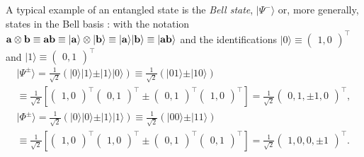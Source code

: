 {\color{blue}
\bexample
\label{bellstate1}
A typical example of an entangled state is the
{\em Bell state},   $\vert \Psi^- \rangle$
or, more generally, states in the Bell basis  :
with the notation $
{\bf a}
\otimes
{\bf b}
\equiv
{\bf a}
{\bf b}
\equiv
\vert {\bf a}\rangle
\otimes
\vert {\bf b}\rangle
\equiv
\vert {\bf a}\rangle
\vert {\bf b}\rangle
\equiv
\vert {\bf a} {\bf b}\rangle
$
and the identifications
$\vert 0 \rangle \equiv  \begin{pmatrix}1,0\end{pmatrix}^\intercal$ and
$\vert 1 \rangle \equiv  \begin{pmatrix}0,1\end{pmatrix}^\intercal$
\begin{equation}
\begin{split}
\vert \Psi^\pm \rangle
 = \frac{1}{\sqrt{2}}\left(\vert 0 \rangle \vert 1 \rangle \pm \vert 1 \rangle \vert 0 \rangle  \right)
\equiv \frac{1}{\sqrt{2}}\left(\vert 0   1 \rangle \pm \vert 1   0 \rangle  \right)
\qquad \qquad
\\
\equiv
\frac{1}{\sqrt{2}}
\left[
\begin{pmatrix}1,0\end{pmatrix}^\intercal
\begin{pmatrix}0,1\end{pmatrix}^\intercal
\pm
\begin{pmatrix}0,1\end{pmatrix}^\intercal
\begin{pmatrix}1,0\end{pmatrix}^\intercal
\right]
=
\frac{1}{\sqrt{2}}
\begin{pmatrix}0,1,\pm 1,0\end{pmatrix}^\intercal
,\\
\vert \Phi^\pm \rangle
 = \frac{1}{\sqrt{2}}\left(\vert 0 \rangle \vert 0 \rangle \pm \vert 1 \rangle \vert 1 \rangle  \right)
 \equiv \frac{1}{\sqrt{2}}\left(\vert 0   0 \rangle \pm \vert 1   1 \rangle  \right)
\qquad \qquad
\\
\equiv
\frac{1}{\sqrt{2}}
\left[
\begin{pmatrix}1,0\end{pmatrix}^\intercal
\begin{pmatrix}1,0\end{pmatrix}^\intercal
\pm
\begin{pmatrix}0,1\end{pmatrix}^\intercal
\begin{pmatrix}0,1\end{pmatrix}^\intercal
\right]
=
\frac{1}{\sqrt{2}}
\begin{pmatrix}1,0,0,\pm 1\end{pmatrix}^\intercal.
\end{split}
\label{2014-m-ch-fdvs-bellbasis}
\end{equation}

}
